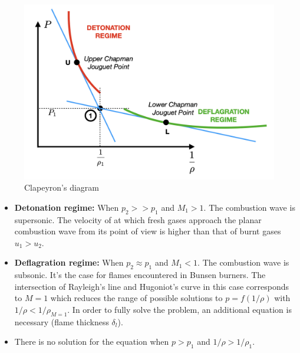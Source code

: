 \documentclass[a4paper,11pt]{article}
\begin{document}
\begin{figure}[ht]
	\centering
	\includegraphics[width=.49\linewidth]{figures/clapeyron.png}
	\caption{Clapeyron's diagram}
\end{figure}
\begin{itemize}
	\item \textbf{Detonation regime:} When $p_2>>p_1$ and $M_1>1$. The combustion wave is supersonic. The velocity of at which fresh gases approach the planar combustion wave from its point of view is higher than that of burnt gases $u_1>u_2$.
	\item \textbf{Deflagration regime:} When $p_2 \approx p_1$ and $M_1<1$. The combustion wave is subsonic. It's the case for flames encountered in Bunsen burners. The intersection of Rayleigh's line and Hugoniot's curve in this case corresponds to $M=1$ which reduces the range of possible solutions to $p=f(1/\rho)$ with $1/\rho < 1/\rho_{M=1}$. In order to fully solve the problem, an additional equation is necessary (flame thickness $\delta_l$).
	\item There is no solution for the equation when $p>p_1$ and $1/\rho > 1/\rho_1$.
\end{itemize}
\end{document}
